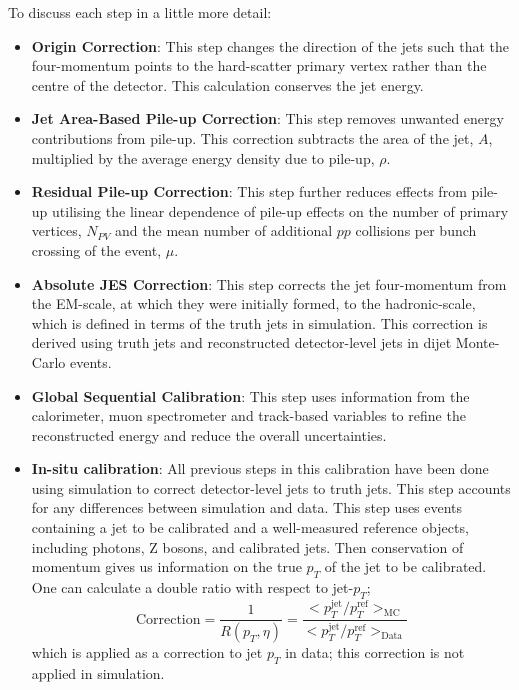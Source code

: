 \noindent
To discuss each step in a little more detail:
\begin{itemize}[leftmargin=*]
\item\textbf{Origin Correction}:
  This step changes the direction of the jets such that the four-momentum points to the hard-scatter primary vertex
  rather than the centre of the detector.
  This calculation conserves the jet energy.\vspace{0.5em}
\item\textbf{Jet Area-Based Pile-up Correction}:
  This step removes unwanted energy contributions from pile-up.
  This correction subtracts the area of the jet, $A$, multiplied by the average energy density due to pile-up, $\rho$.\vspace{0.5em}
\item\textbf{Residual Pile-up Correction}:
  This step further reduces effects from pile-up utilising the linear dependence of pile-up effects on
  the number of primary vertices, $N_{PV}$
  and the mean number of additional $pp$ collisions per bunch crossing of the event, $\mu$.\vspace{0.5em}
\item\textbf{Absolute JES Correction}:
  This step corrects the jet four-momentum from the EM-scale, at which they were initially formed,
  to the hadronic-scale, which is defined in terms of the truth jets in simulation.
  This correction is derived using truth jets and reconstructed detector-level jets in dijet Monte-Carlo events.\vspace{0.5em}
\item\textbf{Global Sequential Calibration}:
  This step uses information from the calorimeter, muon spectrometer and track-based variables
  to refine the reconstructed energy and reduce the overall uncertainties.\vspace{0.5em}
\item\textbf{In-situ calibration}:
  All previous steps in this calibration have been done using simulation to correct
  detector-level jets to truth jets. This step accounts for any differences between simulation and data.
  This step uses events containing a jet to be calibrated and a well-measured reference objects, including photons, Z bosons, and calibrated jets.
  Then conservation of momentum gives us information on the true $p_T$ of the jet to be calibrated.
  One can calculate a double ratio with respect to jet-$p_T$;
  \begin{equation}
    \text{Correction} = \frac{1}{R(p_T, \eta)} = \frac{ < p_T^{\text{jet}}/p_T^{\text{ref}}>_{\text{MC}} }{ < p_T^{\text{jet}}/p_T^{\text{ref}}>_{\text{Data}} }
  \end{equation}
  which is applied as a correction to jet $p_T$ in data; this correction is not applied in simulation.
\end{itemize}

